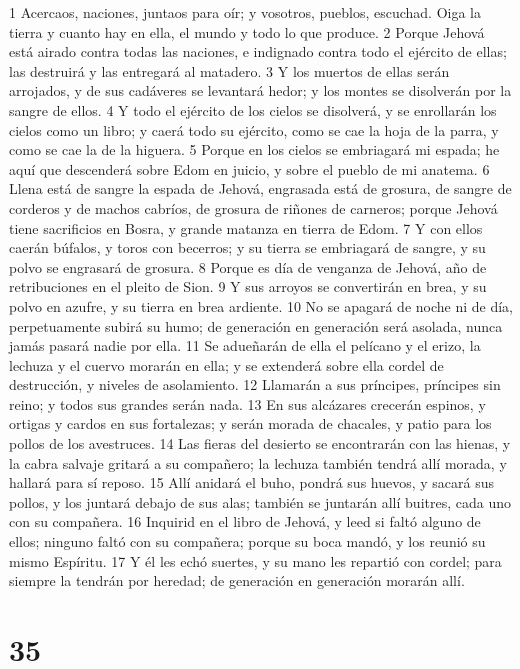 1 Acercaos, naciones, juntaos para oír; y vosotros, pueblos, escuchad. Oiga la tierra y cuanto hay en ella, el mundo y todo lo que produce.
2 Porque Jehová está airado contra todas las naciones, e indignado contra todo el ejército de ellas; las destruirá y las entregará al matadero.
3 Y los muertos de ellas serán arrojados, y de sus cadáveres se levantará hedor; y los montes se disolverán por la sangre de ellos.
4 Y todo el ejército de los cielos se disolverá, y se enrollarán los cielos como un libro; y caerá todo su ejército, como se cae la hoja de la parra, y como se cae la de la higuera. 
5 Porque en los cielos se embriagará mi espada; he aquí que descenderá sobre Edom en juicio, y sobre el pueblo de mi anatema.
6 Llena está de sangre la espada de Jehová, engrasada está de grosura, de sangre de corderos y de machos cabríos, de grosura de riñones de carneros; porque Jehová tiene sacrificios en Bosra, y grande matanza en tierra de Edom. 
7 Y con ellos caerán búfalos, y toros con becerros; y su tierra se embriagará de sangre, y su polvo se engrasará de grosura.
8 Porque es día de venganza de Jehová, año de retribuciones en el pleito de Sion.
9 Y sus arroyos se convertirán en brea, y su polvo en azufre, y su tierra en brea ardiente.
10 No se apagará de noche ni de día, perpetuamente subirá su humo; de generación en generación será asolada, nunca jamás pasará nadie por ella.
11 Se adueñarán de ella el pelícano y el erizo, la lechuza y el cuervo morarán en ella; y se extenderá sobre ella cordel de destrucción, y niveles de asolamiento. 
12 Llamarán a sus príncipes, príncipes sin reino; y todos sus grandes serán nada.
13 En sus alcázares crecerán espinos, y ortigas y cardos en sus fortalezas; y serán morada de chacales, y patio para los pollos de los avestruces.
14 Las fieras del desierto se encontrarán con las hienas, y la cabra salvaje gritará a su compañero; la lechuza también tendrá allí morada, y hallará para sí reposo.
15 Allí anidará el buho, pondrá sus huevos, y sacará sus pollos, y los juntará debajo de sus alas; también se juntarán allí buitres, cada uno con su compañera.
16 Inquirid en el libro de Jehová, y leed si faltó alguno de ellos; ninguno faltó con su compañera; porque su boca mandó, y los reunió su mismo Espíritu.
17 Y él les echó suertes, y su mano les repartió con cordel; para siempre la tendrán por heredad; de generación en generación morarán allí.

\chapter{35}

